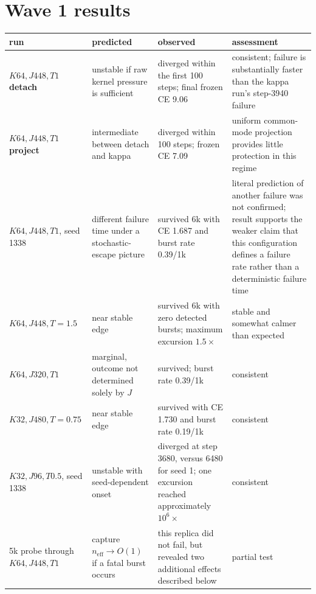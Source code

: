 \documentclass[11pt,a4paper]{article}
\newcommand{\neff}{n_{\mathrm{eff}}}
\begin{document}
\section{Wave 1 results}

\begin{center}\small
\begin{tabular}{p{2.9cm}p{3.1cm}p{4.2cm}p{3.4cm}}
\toprule
run & predicted & observed & assessment \\
\midrule

\(K64,J448,T1\) \textbf{detach}
&
unstable if raw kernel pressure is sufficient
&
diverged within the first 100 steps; final frozen CE 9.06
&
consistent; failure is substantially faster than the kappa run's step-3940
failure
\\

\(K64,J448,T1\) \textbf{project}
&
intermediate between detach and kappa
&
diverged within 100 steps; frozen CE 7.09
&
uniform common-mode projection provides little protection in this regime
\\

\(K64,J448,T1\), seed 1338
&
different failure time under a stochastic-escape picture
&
survived 6k with CE 1.687 and burst rate 0.39/1k
&
literal prediction of another failure was not confirmed; result supports the
weaker claim that this configuration defines a failure rate rather than a
deterministic failure time
\\

\(K64,J448,T=1.5\)
&
near stable edge
&
survived 6k with zero detected bursts; maximum excursion \(1.5\times\)
&
stable and somewhat calmer than expected
\\

\(K64,J320,T1\)
&
marginal, outcome not determined solely by \(J\)
&
survived; burst rate 0.39/1k
&
consistent
\\

\(K32,J480,T=0.75\)
&
near stable edge
&
survived with CE 1.730 and burst rate 0.19/1k
&
consistent
\\

\(K32,J96,T0.5\), seed 1338
&
unstable with seed-dependent onset
&
diverged at step 3680, versus 6480 for seed 1; one excursion reached
approximately \(10^6\times\)
&
consistent
\\

5k probe through \(K64,J448,T1\)
&
capture \(\neff\to O(1)\) if a fatal burst occurs
&
this replica did not fail, but revealed two additional effects described
below
&
partial test
\\

\bottomrule
\end{tabular}
\end{center}
\end{document}
